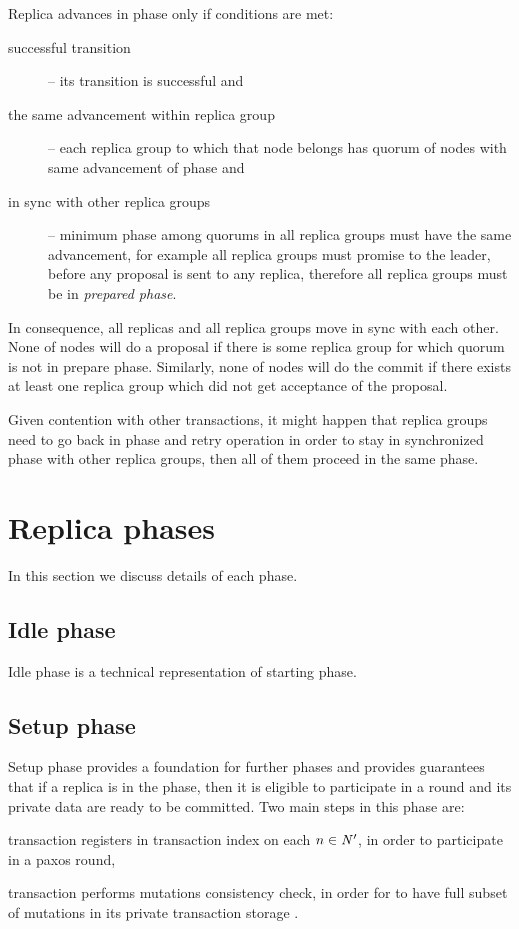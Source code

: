 Replica advances in phase only if conditions are met: \begin{description}
\item[successful transition] -- its transition is successful and
\item[the same advancement within replica group] -- each replica group to which that node belongs has quorum of nodes
with same advancement of phase and
\item[in sync with other replica groups] -- minimum phase among quorums in all replica groups must have the same
advancement, for example all replica groups must promise to the leader, before any proposal is sent to any replica, therefore all replica groups must be in \emph{prepared phase}.
\end{description}


In consequence, all replicas and all replica groups move in sync with each other. None of nodes will do a proposal if there is some replica group for which quorum is not in prepare phase. 
Similarly, none of nodes will do the commit if there exists at least one replica group which did not get acceptance of the proposal.  

Given contention with other transactions, it might happen that replica groups need to go back in phase and retry
operation in order to stay in synchronized phase with other replica groups, then all of them proceed in the same phase.

\section{Replica phases}
In this section we discuss details of each phase.

\subsection{Idle phase}
Idle phase is a technical representation of starting phase.

\subsection{Setup phase}
Setup phase provides a foundation for further phases and provides guarantees that if a replica is in the phase, then it is eligible to participate in a \paxos round and its private data are ready to be committed. Two main steps in this phase are: \begin{enumerate*}[label=\alph*)]
\item transaction \transaction registers in transaction index \txIndex on each $n\in \text{$\mathit{N'}$}$, in order to participate in a paxos round,
\item transaction \transaction performs mutations consistency check, in order for  to have full subset of mutations \mutations in its private transaction storage \txStorage.
\end{enumerate*}


